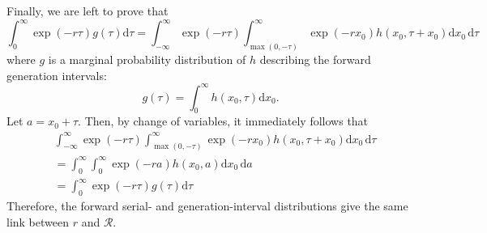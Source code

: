 \documentclass[12pt]{article}
\begin{document}
Finally, we are left to prove that 
\begin{equation}
\int_0^{\infty} \exp(-r\tau) g(\tau) \mathrm{d}\tau = \int_{-\infty}^{\infty} \exp(-r\tau) \int_{\max(0, -\tau)}^\infty \exp(- r x_0) h(x_0, \tau+x_0) \mathrm{d} x_0\, \mathrm{d}\tau
\end{equation}
where $g$ is a marginal probability distribution of $h$ describing the forward generation intervals:
\begin{equation}
g(\tau) = \int_0^\infty h(x_0, \tau)  \mathrm{d} x_0.
\end{equation}
Let $a = x_0 + \tau$. Then, by change of variables, it immediately follows that
\begin{equation}
\begin{aligned}
&\int_{-\infty}^{\infty} \exp(-r\tau) \int_{\max(0, -\tau)}^\infty \exp(- r x_0) h(x_0, \tau+x_0) \mathrm{d} x_0\, \mathrm{d}\tau\\
&=\int_{0}^{\infty} \int_{0}^\infty \exp(- r a) h(x_0, a) \mathrm{d} x_0\, \mathrm{d}a\\
&=\int_{0}^{\infty} \exp(-r\tau) g(\tau) \mathrm{d}\tau
\end{aligned}
\end{equation}
Therefore, the forward serial- and generation-interval distributions give the same link between $r$ and $\mathcal R$.


\end{document}
